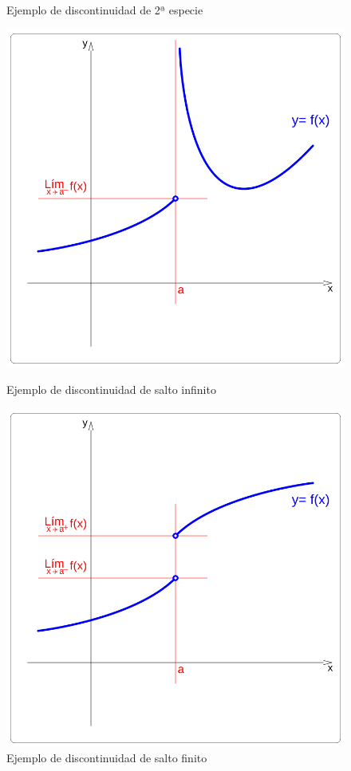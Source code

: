 \begin{figure}
\caption{Ejemplo de discontinuidad de 2ª especie}
\includegraphics[scale=0.25]{img/Funs/funcion_xy_discontin_6ueR5}
\caption{Ejemplo de discontinuidad de salto infinito}
\includegraphics[scale=0.25]{img/Funs/funcion_xy_discontin_U72G2}
\caption{Ejemplo de discontinuidad de salto finito}
\end{figure}



